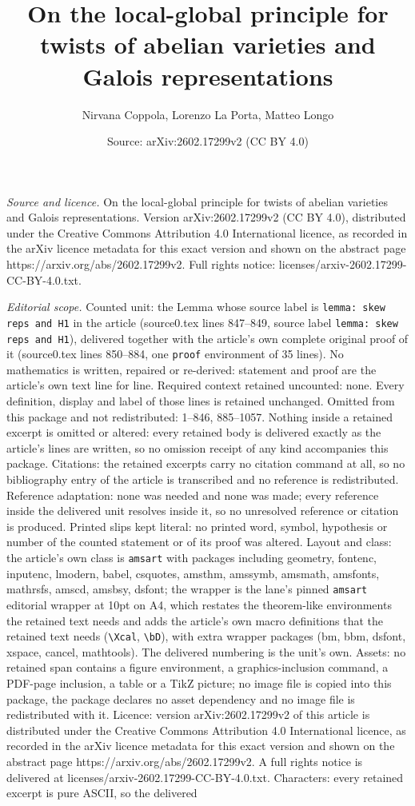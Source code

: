 \documentclass[10pt,a4paper]{amsart}
\title[On the local-global principle for twists of abelian varietie]{On the local-global principle for twists of abelian varieties and Galois representations}
\author{Nirvana Coppola, Lorenzo La Porta, Matteo Longo}
\date{Source: arXiv:2602.17299v2 (CC BY 4.0)}
\begin{document}
\maketitle

\noindent\emph{Source and licence.} On the local-global principle for twists of abelian varieties and Galois representations. Version arXiv:2602.17299v2 (CC BY 4.0), distributed under the Creative Commons Attribution 4.0 International licence, as recorded in the arXiv licence metadata for this exact version and shown on the abstract page https://arxiv.org/abs/2602.17299v2. Full rights notice: licenses/arxiv-2602.17299-CC-BY-4.0.txt.\par\smallskip

\noindent\textit{Editorial scope.} Counted unit: the Lemma whose source label is \texttt{lemma: skew reps and H1} in the article (source0.tex lines 847--849, source label \texttt{lemma: skew reps and H1}), delivered together with the article's own complete original proof of it (source0.tex lines 850--884, one \texttt{proof} environment of 35 lines). No mathematics is written, repaired or re-derived: statement and proof are the article's own text line for line. Required context retained uncounted: none. Every definition, display and label of those lines is retained unchanged. Omitted from this package and not redistributed: 1--846, 885--1057. Nothing inside a retained excerpt is omitted or altered: every retained body is delivered exactly as the article's lines are written, so no omission receipt of any kind accompanies this package. Citations: the retained excerpts carry no citation command at all, so no bibliography entry of the article is transcribed and no reference is redistributed. Reference adaptation: none was needed and none was made; every reference inside the delivered unit resolves inside it, so no unresolved reference or citation is produced. Printed slips kept literal: no printed word, symbol, hypothesis or number of the counted statement or of its proof was altered. Layout and class: the article's own class is \texttt{amsart} with packages including geometry, fontenc, inputenc, lmodern, babel, csquotes, amsthm, amssymb, amsmath, amsfonts, mathrsfs, amscd, amsbsy, dsfont; the wrapper is the lane's pinned \texttt{amsart} editorial wrapper at 10pt on A4, which restates the theorem-like environments the retained text needs and adds the article's own macro definitions that the retained text needs (\texttt{\textbackslash Xcal}, \texttt{\textbackslash bD}), with extra wrapper packages (bm, bbm, dsfont, xspace, cancel, mathtools). The delivered numbering is the unit's own. Assets: no retained span contains a figure environment, a graphics-inclusion command, a PDF-page inclusion, a table or a TikZ picture; no image file is copied into this package, the package declares no asset dependency and no image file is redistributed with it. Licence: version arXiv:2602.17299v2 of this article is distributed under the Creative Commons Attribution 4.0 International licence, as recorded in the arXiv licence metadata for this exact version and shown on the abstract page https://arxiv.org/abs/2602.17299v2. A full rights notice is delivered at licenses/arxiv-2602.17299-CC-BY-4.0.txt. Characters: every retained excerpt is pure ASCII, so the delivered 
\end{document}

